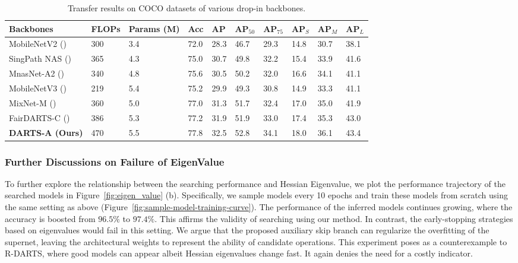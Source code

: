 \documentclass{article} \usepackage{iclr2021_conference,times}
\newcommand{\citeyp}[1]{(\citeyear{#1})}
\begin{document}
\begin{table*}[ht]
	\small
	\begin{center}
		\caption{Transfer results on COCO datasets of various drop-in backbones.}
		\label{table:darts-coco-retina}
		\begin{tabular}{*{1}{l}H*{8}{l}}
			\toprule
			\textbf{Backbones} &\textbf{FLOPs}  & \textbf{Params (M)} & \textbf{Acc}  & \textbf{AP} & \textbf{AP$_{50}$} & \textbf{AP$_{75}$} & \textbf{AP$_S$} & \textbf{AP$_M$} & \textbf{AP$_L$} \\
\midrule
			MobileNetV2 \citeyp{sandler2018mobilenetv2} & 300 & 3.4& 72.0 & 28.3 & 46.7 & 29.3 & 14.8 & 30.7 & 38.1\\
			SingPath NAS \citeyp{stamoulis2019single} & 365 & 4.3 & 75.0 & 30.7 & 49.8 & 32.2 & 15.4 &33.9 & 41.6\\
			MnasNet-A2 \citeyp{tan2018mnasnet} & 340& 4.8 & 75.6 & 30.5 & 50.2 & 32.0 & 16.6 & 34.1 & 41.1\\
MobileNetV3 \citeyp{howard2019searching} & 219 & 5.4 & 75.2& 29.9 & 49.3 & 30.8 & 14.9 & 33.3 & 41.1\\
MixNet-M \citeyp{tan2020mixconv} & 360 & 5.0 & 77.0 & 31.3& 51.7 & 32.4& 17.0 & 35.0 & 41.9   \\
			FairDARTS-C \citeyp{chu2019fair} & 386 & 5.3 & 77.2 & 31.9 & 51.9 & 33.0 & 17.4 & 35.3 & 43.0 \\
			\textbf{DARTS-A (Ours)} & 470 & 5.5& 77.8& 32.5& 52.8 & 34.1& 18.0 & 36.1 & 43.4  \\
			
			\bottomrule
\end{tabular}
	\end{center}
	\vskip -0.15in
\end{table*}

\subsubsection{Further Discussions on Failure of EigenValue}\label{sec:failure_eigen}

To further explore the relationship between the searching performance and Hessian Eigenvalue, we plot the performance trajectory of the searched models in Figure~\ref{fig:eigen_value} (b). Specifically, we sample models every 10 epochs and train these models from scratch using the same setting as above (Figure~\ref{fig:sample-model-training-curve}). The performance of the inferred models continues growing, where the accuracy is boosted from $96.5\%$ to $97.4\%$. This affirms the validity of searching using our method. In contrast, the early-stopping strategies based on eigenvalues \citep{zela2020understanding} would fail in this setting. We argue that the proposed auxiliary skip branch can regularize the overfitting of the supernet, leaving the architectural weights to represent the ability of candidate operations. This experiment poses as a counterexample to R-DARTS, where good models can appear albeit Hessian eigenvalues change fast. It again denies the need for a costly indicator.
\end{document}
